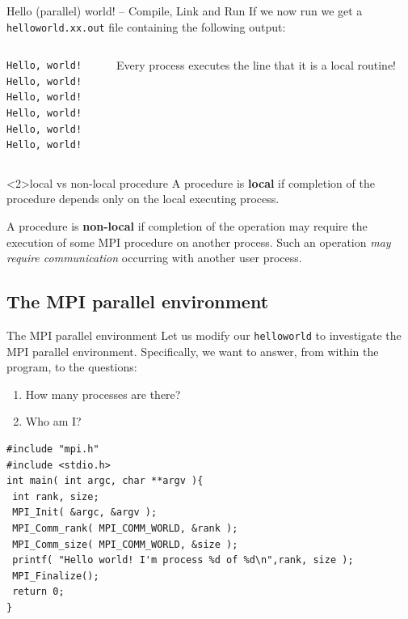 \documentclass[xcolor={svgnames,usenames}]{beamer}
\begin{document}
\begin{frame}[fragile]{Hello (parallel) world! -- Compile, Link and Run}
If we now run 
we get a \texttt{helloworld.xx.out} file containing the following output:
\begin{columns}
\begin{column}{0.4\columnwidth}
\begin{verbatim}
Hello, world!
Hello, world!
Hello, world!
Hello, world!
Hello, world!
Hello, world!
\end{verbatim}
\end{column}
\begin{column}{0.6\columnwidth}
Every process executes the line  that it is a \alert{local} routine!
\end{column}
\end{columns}
\begin{block}<2>{local vs non-local procedure}
	A procedure is \textbf{local} if completion of the procedure depends only on the local executing process.
	
	A procedure is \textbf{non-local} if completion of the operation may require the execution of some MPI procedure on another process. Such an operation \emph{may require
	communication} occurring with another user process.
\end{block}
\end{frame}

\subsection{The MPI parallel environment}
\begin{frame}[fragile]{The MPI parallel environment}
Let us modify our \texttt{helloworld} to investigate the MPI parallel environment. Specifically, we want to answer, from within the program, to the questions:
\begin{enumerate} 
	\item How many processes are there?
	\item Who am I?
\end{enumerate}
\begin{verbatim}
#include "mpi.h"
#include <stdio.h>
int main( int argc, char **argv ){
 int rank, size;
 MPI_Init( &argc, &argv );
 MPI_Comm_rank( MPI_COMM_WORLD, &rank );
 MPI_Comm_size( MPI_COMM_WORLD, &size );
 printf( "Hello world! I'm process %d of %d\n",rank, size );
 MPI_Finalize();
 return 0;
}
\end{verbatim}
\end{frame}
\end{document}

